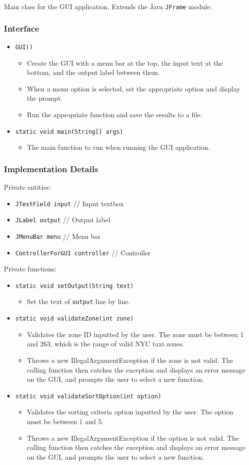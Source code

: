\documentclass[12pt]{article}
\newcommand{\bi}{\begin{itemize}}
\newcommand{\ei}{\end{itemize}}
\newcommand{\code}[1]{\texttt{#1}}
\begin{document}
Main class for the GUI application. Extends the Java \code{JFrame} module. 

\subsubsection{Interface}

\bi
	\item \code{GUI()}
	\bi
	    \item Create the GUI with a menu bar at the top, the input text at the bottom, and the output label between them.
		\item When a menu option is selected, set the appropriate option and display the prompt.
		\item Run the appropriate function and save the results to a file.
	\ei
    \item \code{static void main(String[] args)}
    \bi
        \item The main function to run when running the GUI application.
    \ei
\ei

\subsubsection{Implementation Details}

Private entities:
\bi
	\item \code{JTextField input} // Input textbox
	\item \code{JLabel output} // Output label
	\item \code{JMenuBar menu} // Menu bar
	\item \code{ControllerForGUI controller} // Controller
\ei

\noindent Private functions:
\bi
	\item \code{static void setOutput(String text)}
	\bi
		\item Set the text of \code{output} line by line. 
	\ei
    \item \code{static void validateZone(int zone)}
    \bi
        \item Validates the zone ID inputted by the user. The zone must be between 1 and 263, which is the range of valid NYC taxi zones.
        \item Throws a new IllegalArgumentException if the zone is not valid. The calling function then catches the exception and displays an error message on the GUI, and prompts the user to select a new function.
    \ei
    \item \code{static void validateSortOption(int option)}
    \bi
        \item Validates the sorting criteria option inputted by the user. The option must be between 1 and 5. 
        \item Throws a new IllegalArgumentException if the option is not valid. The calling function then catches the exception and displays an error message on the GUI, and prompts the user to select a new function.
    \ei
\ei
\end{document}
